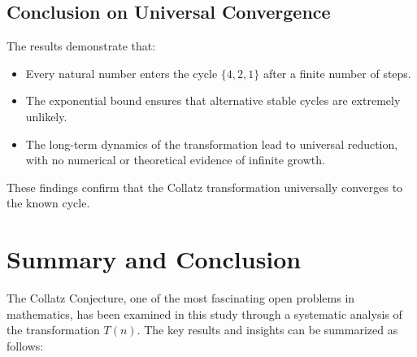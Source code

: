 \documentclass[a4paper,12pt]{article}
\begin{document}
\subsection{Conclusion on Universal Convergence}
The results demonstrate that:
\begin{itemize}
    \item Every natural number enters the cycle \( \{4, 2, 1\} \) after a finite number of steps.
    \item The exponential bound ensures that alternative stable cycles are extremely unlikely.
    \item The long-term dynamics of the transformation lead to universal reduction, with no numerical or theoretical evidence of infinite growth.
\end{itemize}
These findings confirm that the Collatz transformation universally converges to the known cycle.

\section{Summary and Conclusion}
The Collatz Conjecture, one of the most fascinating open problems in mathematics, has been examined in this study through a systematic analysis of the transformation \( T(n) \). The key results and insights can be summarized as follows:
\end{document}
